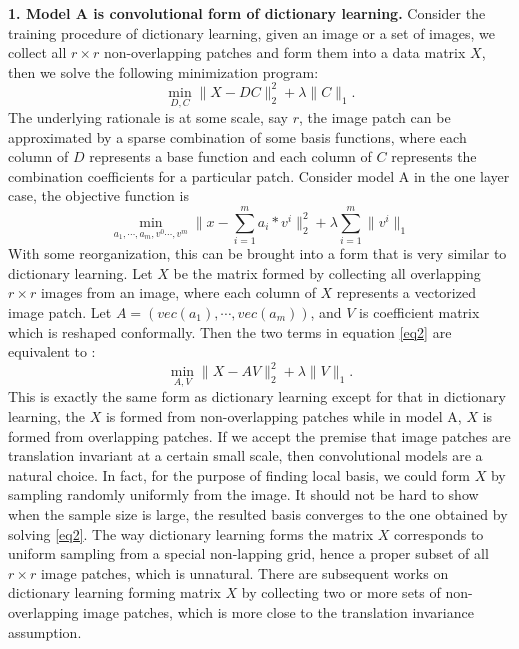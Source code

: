 \documentclass[a4paper]{article}
\begin{document}
\textbf{1. Model A is convolutional form of dictionary learning.} Consider the training procedure of dictionary learning, given an image or a set of images, we collect all $r\times r$ non-overlapping patches and form them into a data matrix $X$, then we solve the following minimization program:
\begin{equation}
	\min_{D,C} \|X-DC\|_2^2 + \lambda\|C\|_1.
\end{equation}
The underlying rationale is at some scale, say $r$, the image patch can be approximated by a sparse combination of some basis functions, where each column of $D$ represents a base function and each column of $C$ represents the combination coefficients for a particular patch.
Consider model A in the one layer case, the objective function is 
\begin{equation}
\label{eq2}
	\min_{a_1,\cdots,a_m,v^{0}\cdots ,v^{m}} \|x-\sum_{i=1}^{m} a_i*v^{i}\|_2^2 +\lambda \sum_{i=1}^{m} \|v^{i}\|_1
\end{equation}
With some reorganization, this can be brought into a form that is very similar to dictionary learning. Let $X$ be the matrix formed by collecting all overlapping $r\times r$ images from an image, where each column of $X$ represents a vectorized image patch. Let $A=(vec(a_1),\cdots, vec(a_m))$, and $V$ is coefficient matrix which is reshaped conformally. Then the two terms in equation \eqref{eq2} are equivalent to :
\begin{equation}
	\min_{A,V} \|X-AV\|_2^2+\lambda \|V\|_1.
\end{equation}
This is exactly the same form as dictionary learning except for that in dictionary learning, the $X$ is formed from non-overlapping patches while in model A, $X$ is formed from overlapping patches. If we accept the premise that image patches are translation invariant at a certain small scale, then convolutional models are a natural choice. In fact, for the purpose of finding local basis, we could form $X$ by sampling randomly uniformly from the image. It should not be hard to show when the sample size is large, the resulted basis converges to the one obtained by solving \eqref{eq2}. The way dictionary learning forms the matrix $X$ corresponds to uniform sampling from a special non-lapping grid, hence a proper subset of all $r\times r$ image patches, which is unnatural. There are subsequent works on dictionary learning forming matrix $X$ by collecting two or more sets of non-overlapping image patches, which is more close to the translation invariance assumption.
\end{document}

